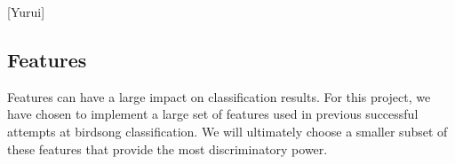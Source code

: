 \documentclass[12pt,peerreview,letterpaper]{IEEEtran}
\begin{document}
[Yurui]
%
%
%

\subsection{Features}
\label{sec:Features}

Features can have a large impact on classification results. For this project, we have chosen to implement a large set of features used in previous successful attempts at birdsong classification. We will ultimately choose a smaller subset of these features that provide the most discriminatory power.
\end{document}
